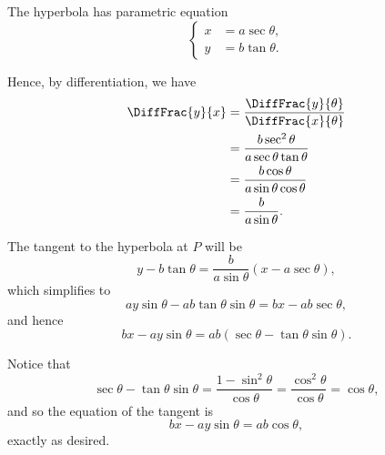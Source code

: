 \Question{\currfilebase}

The hyperbola has parametric equation
\[
    \left\{
    \begin{aligned}
        x & = a \sec \theta, \\
        y & = b \tan \theta.
    \end{aligned}
    \right.
\]

Hence, by differentiation, we have
\begin{align*}
    \DiffFrac{y}{x} & = \frac{\DiffFrac{y}{\theta}}{\DiffFrac{x}{\theta}} \\
                    & = \frac{b \sec^2 \theta}{a \sec \theta \tan \theta} \\
                    & = \frac{b \cos \theta}{a \sin \theta \cos \theta}   \\
                    & = \frac{b}{a \sin \theta}.
\end{align*}

The tangent to the hyperbola at \(P\) will be
\[
    y - b \tan \theta = \frac{b}{a \sin \theta} (x - a \sec \theta),
\]
which simplifies to
\[
    ay \sin \theta - ab \tan \theta \sin \theta = bx - ab \sec \theta,
\]
and hence
\[
    bx - ay \sin \theta = ab (\sec \theta - \tan \theta \sin \theta).
\]

Notice that
\[
    \sec \theta - \tan \theta \sin \theta = \frac{1 - \sin^2 \theta}{\cos \theta} = \frac{\cos^2 \theta}{\cos \theta} = \cos \theta,
\]
and so the equation of the tangent is
\[
    bx - ay \sin \theta = ab \cos \theta,
\]
exactly as desired.


